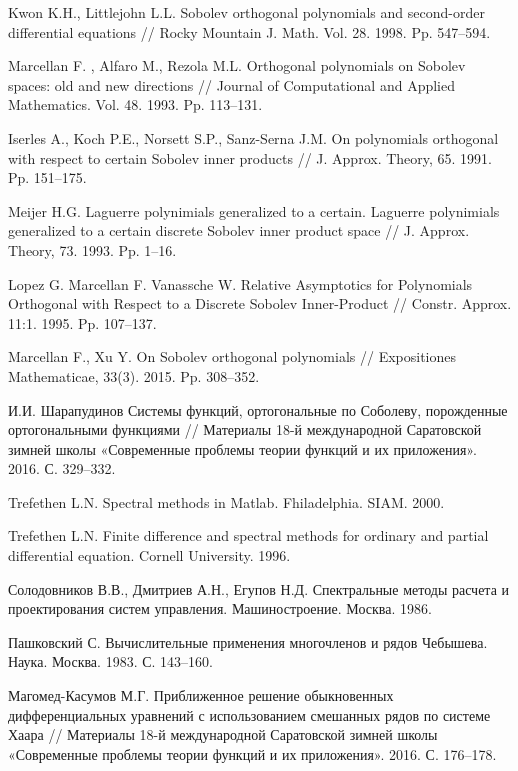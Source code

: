 \begin{thebibliography}{111}
{Kwon K.H., Littlejohn L.L.}
 Sobolev orthogonal polynomials and second-order differential equations
// Rocky Mountain J. Math. Vol. 28. 1998. Pp. 547--594.


{Marcellan F. , Alfaro M., Rezola M.L.} Orthogonal polynomials on Sobolev spaces: old and new directions
// Journal of Computational and Applied Mathematics. Vol. 48. 1993. Pp. 113--131.


{ Iserles A., Koch P.E., Norsett S.P., Sanz-Serna J.M.}
 On polynomials  orthogonal  with respect  to certain Sobolev inner products
// J. Approx. Theory, 65. 1991. Pp. 151--175.


{Meijer H.G.} Laguerre polynimials generalized to a certain.
Laguerre polynimials generalized to a certain discrete Sobolev inner product space
// J. Approx. Theory, 73. 1993. Pp. 1--16.


{Lopez G. Marcellan F. Vanassche W.}
 Relative Asymptotics for Polynomials Orthogonal with Respect to a Discrete Sobolev Inner-Product
// Constr. Approx. 11:1. 1995. Pp. 107--137.


{Marcellan F., Xu Y.}
 On Sobolev orthogonal polynomials
// Expositiones Mathematicae, 33(3). 2015. Pp. 308--352.


И.И. Шарапудинов
 Системы функций, ортогональные по Соболеву, порожденные ортогональными функциями
// Материалы 18-й международной Саратовской зимней школы «Современные проблемы теории функций и их приложения». 2016. С. 329--332.


{Trefethen  L.N.} Spectral methods in Matlab. Fhiladelphia. SIAM. 2000.


{Trefethen  L.N.}
Finite difference and spectral methods for ordinary and partial differential equation. Cornell University. 1996.


{Солодовников В.В., Дмитриев А.Н., Егупов Н.Д.}
Спектральные методы расчета и проектирования систем управления. Машиностроение. Москва. 1986.


{Пашковский С.} Вычислительные применения многочленов и рядов Чебышева. Наука. Москва. 1983. С. 143--160.


{Магомед-Касумов М.Г.}
 Приближенное решение обыкновенных дифференциальных уравнений с использованием смешанных рядов по системе Хаара
// Материалы 18-й международной Саратовской зимней школы «Современные проблемы теории функций и их приложения». 2016. С. 176--178.



\end{thebibliography}
